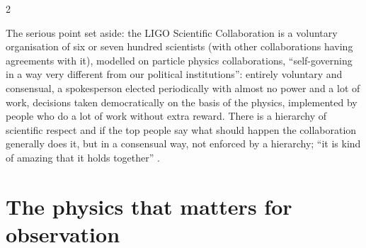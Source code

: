 \begin{paracol}{2}
\begin{aside}
The serious point set aside: the LIGO Scientific Collaboration is a voluntary organisation of six or seven hundred scientists (with other collaborations having agreements with it), modelled on particle physics collaborations, ``self-governing in a way very different from our political institutions'': entirely voluntary and consensual, a spokesperson elected periodically with almost no power and a lot of work, decisions taken democratically on the basis of the physics, implemented by people who do a lot of work without extra reward. There is a hierarchy of scientific respect and if the top people say what should happen the collaboration generally does it, but in a consensual way, not enforced by a hierarchy; ``it is kind of amazing that it holds together'' .
\end{aside}

\section{The physics that matters for observation}\label{sec:c27-physics}


\end{paracol}

